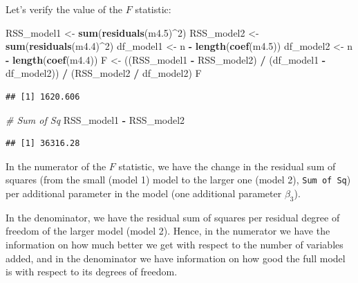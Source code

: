 \documentclass[
]{book}
\newenvironment{Shaded}{\begin{snugshade}}{\end{snugshade}}
\newcommand{\CommentTok}[1]{\textcolor[rgb]{0.56,0.35,0.01}{\textit{#1}}}
\newcommand{\DecValTok}[1]{\textcolor[rgb]{0.00,0.00,0.81}{#1}}
\newcommand{\FloatTok}[1]{\textcolor[rgb]{0.00,0.00,0.81}{#1}}
\newcommand{\FunctionTok}[1]{\textcolor[rgb]{0.13,0.29,0.53}{\textbf{#1}}}
\newcommand{\NormalTok}[1]{#1}
\newcommand{\OtherTok}[1]{\textcolor[rgb]{0.56,0.35,0.01}{#1}}
\newcommand{\SpecialCharTok}[1]{\textcolor[rgb]{0.81,0.36,0.00}{\textbf{#1}}}
\begin{document}
Let's verify the value of the \(F\) statistic:

\begin{Shaded}
\begin{Highlighting}[]
\NormalTok{RSS\_model1 }\OtherTok{\textless{}{-}} \FunctionTok{sum}\NormalTok{(}\FunctionTok{residuals}\NormalTok{(m4}\FloatTok{.5}\NormalTok{)}\SpecialCharTok{\^{}}\DecValTok{2}\NormalTok{)}
\NormalTok{RSS\_model2 }\OtherTok{\textless{}{-}} \FunctionTok{sum}\NormalTok{(}\FunctionTok{residuals}\NormalTok{(m4}\FloatTok{.4}\NormalTok{)}\SpecialCharTok{\^{}}\DecValTok{2}\NormalTok{)}
\NormalTok{df\_model1 }\OtherTok{\textless{}{-}}\NormalTok{ n }\SpecialCharTok{{-}} \FunctionTok{length}\NormalTok{(}\FunctionTok{coef}\NormalTok{(m4}\FloatTok{.5}\NormalTok{))}
\NormalTok{df\_model2 }\OtherTok{\textless{}{-}}\NormalTok{ n }\SpecialCharTok{{-}} \FunctionTok{length}\NormalTok{(}\FunctionTok{coef}\NormalTok{(m4}\FloatTok{.4}\NormalTok{))}
\NormalTok{F }\OtherTok{\textless{}{-}}\NormalTok{ ((RSS\_model1 }\SpecialCharTok{{-}}\NormalTok{ RSS\_model2) }\SpecialCharTok{/}\NormalTok{ (df\_model1 }\SpecialCharTok{{-}}\NormalTok{ df\_model2)) }\SpecialCharTok{/}\NormalTok{ (RSS\_model2 }\SpecialCharTok{/}\NormalTok{ df\_model2)}
\NormalTok{F}
\end{Highlighting}
\end{Shaded}

\begin{verbatim}
## [1] 1620.606
\end{verbatim}

\begin{Shaded}
\begin{Highlighting}[]
\CommentTok{\# Sum of Sq}
\NormalTok{RSS\_model1 }\SpecialCharTok{{-}}\NormalTok{ RSS\_model2}
\end{Highlighting}
\end{Shaded}

\begin{verbatim}
## [1] 36316.28
\end{verbatim}

In the numerator of the \(F\) statistic, we have the change in the residual sum of squares
(from the small (model 1) model to the larger one (model 2), \texttt{Sum\ of\ Sq})
per additional parameter in the model (one additional parameter \(\beta_3\)).

In the denominator, we have the residual sum of squares per residual degree of freedom of
the larger model (model 2). Hence, in the numerator we have the information on how much
better we get with respect to the number of variables added, and in the denominator
we have information on how good the full model is with respect to its degrees of freedom.
\end{document}

